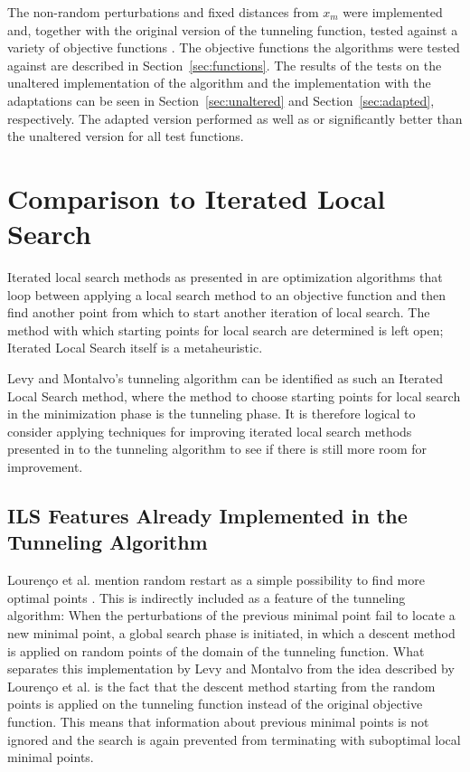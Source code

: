 \documentclass[a4paper,12pt,twoside]{article}
\begin{document}
The non-random perturbations and fixed distances from $x_m$ were implemented and, together with the original version of the tunneling function, tested against a variety of objective functions \cite{heidbrink_nicolasheidbrinkoptimization-seminar_2026}. The objective functions the algorithms were tested against are described in Section~\ref{sec:functions}. The results of the tests on the unaltered implementation of the algorithm and the implementation with the adaptations can be seen in Section~\ref{sec:unaltered} and Section~\ref{sec:adapted}, respectively. The adapted version performed as well as or significantly better than the unaltered version for all test functions.


\section{Comparison to Iterated Local Search}
Iterated local search methods as presented in \cite{lourenco_iterated_2003} are optimization algorithms that loop between applying a local search method to an objective function and then find another point from which to start another iteration of local search. The method with which starting points for local search are determined is left open; Iterated Local Search itself is a metaheuristic.

Levy and Montalvo's tunneling algorithm can be identified as such an Iterated Local Search method, where the method to choose starting points for local search in the minimization phase is the tunneling phase. It is therefore logical to consider applying techniques for improving iterated local search methods presented in \cite{lourenco_iterated_2003} to the tunneling algorithm to see if there is still more room for improvement.

\subsection{ILS Features Already Implemented in the Tunneling Algorithm}
Lourenço et al. mention random restart as a simple possibility to find more optimal points \cite[\S 5.2.2]{lourenco_iterated_2003}. This is indirectly included as a feature of the tunneling algorithm: When the perturbations of the previous minimal point fail to locate a new minimal point, a global search phase is initiated, in which a descent method is applied on random points of the domain of the tunneling function. What separates this implementation by Levy and Montalvo from the idea described by Lourenço et al. is the fact that the descent method starting from the random points is applied on the tunneling function instead of the original objective function. This means that information about previous minimal points is not ignored and the search is again prevented from terminating with suboptimal local minimal points. 
\end{document}
